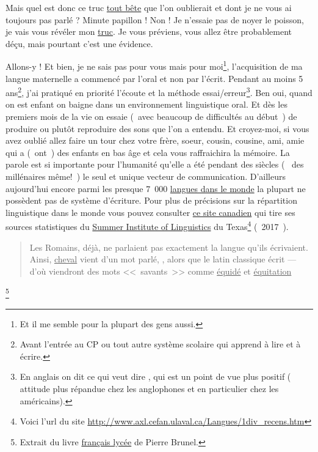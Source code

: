 Mais quel est donc ce truc \underline{tout bête} que l'on oublierait et dont je
ne vous ai toujours pas parlé ? Minute papillon ! Non ! Je n'essaie
pas de noyer le poisson, je vais vous révéler mon \underline{truc}. Je vous
préviens, vous allez être probablement déçu, mais pourtant c'est une
évidence. \par
Allons-y ! Et bien, je ne sais pas pour vous mais pour moi\footnote{Et il me
semble pour la plupart des gens aussi.}, l'acquisition de ma langue
maternelle a commencé par l'oral et non par l'écrit. Pendant au moins
5 ans\footnote{Avant l'entrée au CP ou tout autre système scolaire qui
apprend à lire et à écrire.}, j'ai pratiqué en priorité l'écoute et la
méthode essai/erreur\footnote{En anglais on dit  ce qui veut
dire , qui est un point de vue plus positif (
attitude plus répandue chez les anglophones et en particulier chez les américains).}. Ben
oui, quand on est enfant on baigne dans un environnement linguistique
oral. Et dès les premiers mois de la vie on essaie (~avec beaucoup de
difficultés au début~) de produire ou plutôt reproduire des sons que
l'on a entendu. Et croyez-moi, si vous avez oublié allez faire un tour
chez votre frère, soeur, cousin, cousine, ami, amie qui a (~ont~) des
enfants en bas âge et cela vous raffraichira la mémoire. La parole est
si importante pour l'humanité qu'elle a été pendant des siècles (~ des
millénaires même!~) le seul et unique vecteur de
communication. D'ailleurs aujourd'hui encore parmi les presque 7~000
\href{http://www.museedelhomme.fr/fr/combien-langues-sont-parlees-monde}{langues dans le monde} la plupart ne possèdent pas de système
d'écriture. Pour plus de précisions sur la répartition linguistique
dans le monde vous pouvez consulter \href{http://www.axl.cefan.ulaval.ca/Langues/1div\_recens.htm}{ce site canadien} qui tire ses
sources statistiques du \underline{Summer Institute of Linguistics} du
Texas\footnote{Voici l'url du site
  \url{http://www.axl.cefan.ulaval.ca/Langues/1div_recens.htm}}
(~2017~).\par


\begin{quote}
Les Romains, déjà, ne parlaient pas exactement la langue qu'ils
écrivaient. Ainsi, \underline{cheval} vient d'un mot parlé, , alors
que le latin classique écrit  --- d'où viendront des mots <<~savants~>> comme \underline{équidé} et \underline{équitation}
\end{quote}\footnote{Extrait du livre \href{https://www.amazon.fr/gp/product/2844100015/ref=as\_li\_tl?ie=UTF8\&camp=1642\&creative=6746\&creativeASIN=2844100015\&linkCode=as2\&tag=wwwbecomefree-21\&linkId=985f3a849fd44728e8480993cf2d5490}{français lycée} de Pierre Brunel.}

